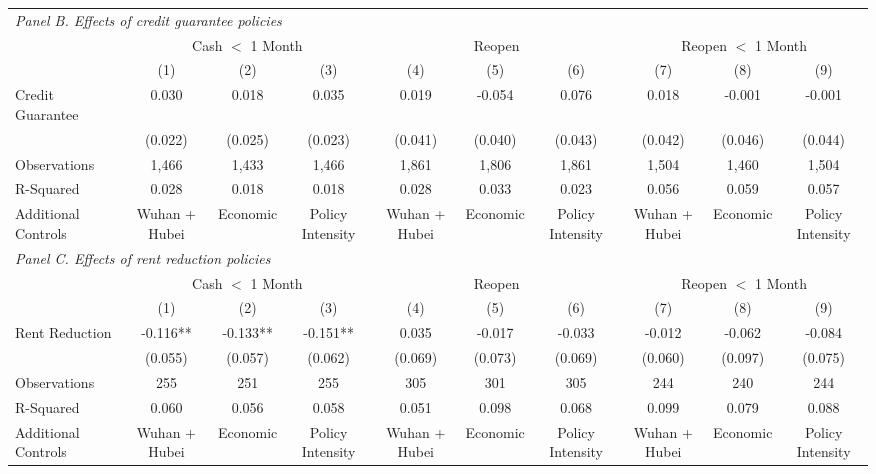 \documentclass{article}
\begin{document}
\begin{table}
\begin{center}
{\begin{threeparttable}
\begin{tabular}{lccccccccc}
\hline
\multicolumn{10}{l}{\textit{Panel B. Effects of credit guarantee policies}} \\
                 & \multicolumn{3}{c}{Cash $<$ 1 Month}        & \multicolumn{3}{c}{Reopen}        & \multicolumn{3}{c}{Reopen $<$ 1 Month} \\
                 & (1)     & (2)        & (3)            & (4)      & (5)       & (6)            & (7)      & (8)        & (9)      \\
Credit Guarantee & 0.030   & 0.018      & 0.035          & 0.019    & -0.054    & 0.076          & 0.018    & -0.001      & -0.001                    \\
                 & (0.022) & (0.025)    & (0.023)        & (0.041)  & (0.040)   & (0.043)        & (0.042)  & (0.046)     & (0.044)                   \\
Observations     & 1,466   & 1,433      & 1,466          & 1,861    & 1,806     & 1,861          & 1,504    & 1,460       & 1,504                     \\
R-Squared        & 0.028   & 0.018      & 0.018          & 0.028    & 0.033     & 0.023          & 0.056    & 0.059       & 0.057                     \\
Additional Controls        & Wuhan + Hubei  & Economic  & Policy Intensity    & Wuhan + Hubei  & Economic   & Policy Intensity      & Wuhan + Hubei  & Economic    & Policy Intensity            \\ \hline

\hline
\multicolumn{10}{l}{\textit{Panel C. Effects of rent reduction policies}} \\
               & \multicolumn{3}{c}{Cash $<$ 1 Month}        & \multicolumn{3}{c}{Reopen}        & \multicolumn{3}{c}{Reopen $<$ 1 Month} \\
               & (1)       & (2)        & (3)            & (4)       & (5)        & (6)            & (7)      & (8)      & (9)                 \\
Rent Reduction & -0.116** & -0.133**    & -0.151**       & 0.035    & -0.017      & -0.033         & -0.012   & -0.062     & -0.084              \\
               & (0.055)  & (0.057)     & (0.062)        & (0.069)  & (0.073)     & (0.069)        & (0.060)  & (0.097)    & (0.075)             \\
Observations   & 255      & 251            & 255         & 305      & 301         & 305            & 244      & 240        & 244                 \\
R-Squared      & 0.060    & 0.056         & 0.058        & 0.051    & 0.098       & 0.068          & 0.099    & 0.079      & 0.088               \\
Additional Controls      & Wuhan + Hubei  & Economic     & Policy Intensity    & Wuhan + Hubei  & Economic  & Policy Intensity  & Wuhan + Hubei  & Economic  & Policy Intensity   \\ \hline


\end{tabular}
\end{threeparttable}}
\end{center}
\end{table}
\end{document}
